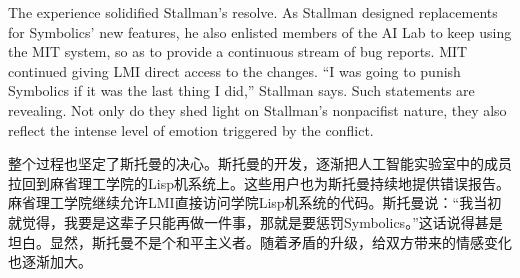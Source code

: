 \ifdefined\eng
The experience solidified Stallman's resolve. As Stallman designed replacements for Symbolics' new features, he also enlisted members of the AI Lab to keep using the MIT system, so as to provide a continuous stream of bug reports. MIT continued giving LMI direct access to the changes. ``I was going to punish Symbolics if it was the last thing I did,'' Stallman says.  Such statements are revealing. Not only do they shed light on Stallman's nonpacifist nature, they also reflect the intense level of emotion triggered by the conflict.
\fi

\ifdefined\chs
整个过程也坚定了斯托曼的决心。斯托曼的开发，逐渐把人工智能实验室中的成员拉回到麻省理工学院的Lisp机系统上。这些用户也为斯托曼持续地提供错误报告。麻省理工学院继续允许LMI直接访问学院Lisp机系统的代码。斯托曼说：``我当初就觉得，我要是这辈子只能再做一件事，那就是要惩罚Symbolics。''这话说得甚是坦白。显然，斯托曼不是个和平主义者。随着矛盾的升级，给双方带来的情感变化也逐渐加大。
\fi
\fi

